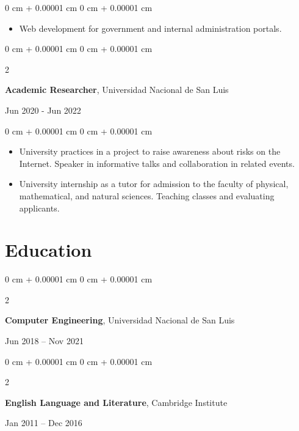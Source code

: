 \documentclass[10pt, letterpaper]{article}
\newenvironment{highlights}{
    \begin{itemize}[
        topsep=0.10 cm,
        parsep=0.10 cm,
        partopsep=0pt,
        itemsep=0pt,
        leftmargin=0 cm + 10pt
    ]
}{
    \end{itemize}
} %
\newenvironment{onecolentry}{
    \begin{adjustwidth}{
        0 cm + 0.00001 cm
    }{
        0 cm + 0.00001 cm
    }
}{
    \end{adjustwidth}
} %
\newenvironment{twocolentry}[2][]{
    \onecolentry
    \def\secondColumn{#2}
    \setcolumnwidth{\fill, 4.5 cm}
    \begin{paracol}{2}
}{
    \switchcolumn \raggedleft \secondColumn
    \end{paracol}
    \endonecolentry
} %
\begin{document}
    \vspace{0.10 cm}
    \begin{onecolentry}
        \begin{highlights}
            \item Web development for government and internal administration portals.
        \end{highlights}
    \end{onecolentry}
    \vspace{0.2 cm}
    \begin{twocolentry}{
            Jun 2020 - Jun 2022
        }
        \textbf{Academic Researcher}, Universidad Nacional de San Luis
    \end{twocolentry}
    \vspace{0.10 cm}
    \begin{onecolentry}
        \begin{highlights}
            \item University practices in a project to raise awareness about risks on the Internet. Speaker in informative talks and collaboration in related events.
            \item University internship as a tutor for admission to the faculty of physical, mathematical, and natural sciences. Teaching classes and evaluating applicants.
        \end{highlights}
    \end{onecolentry}
    \vspace{0.2 cm}
    \section{Education}                   
    \begin{twocolentry}{
        Jun 2018 – Nov 2021
    }
    \textbf{Computer Engineering}, Universidad Nacional de San Luis
    \end{twocolentry}
    \begin{twocolentry}{
            Jan 2011 – Dec 2016
        }
        \textbf{English Language and Literature}, Cambridge Institute
    \end{twocolentry}
\end{document}
